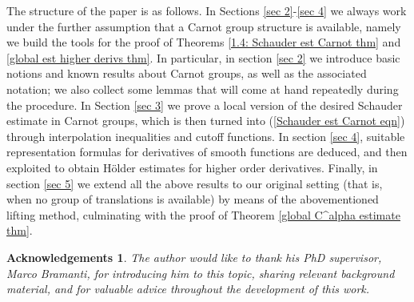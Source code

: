 \documentclass{article}
\newtheorem*{acknowledgement}{Acknowledgements}
\numberwithin{equation}{section}
\begin{document}
\vspace{2mm}

The structure of the paper is as follows. In Sections \ref{sec 2}-\ref{sec 4} we always work under the further assumption that a Carnot group structure is available, namely we build the tools for the proof of Theorems \ref{1.4: Schauder est Carnot thm} and \ref{global est higher derivs thm}. In particular, in section \ref{sec 2} we introduce basic notions and known results about Carnot groups, as well as the associated notation; we also collect some lemmas that will come at hand repeatedly during the procedure. In Section \ref{sec 3} we prove a local version of the desired Schauder estimate in Carnot groups, which is then turned into (\ref{Schauder est Carnot eqn}) through interpolation inequalities and cutoff functions. In section \ref{sec 4}, suitable representation formulas for derivatives of smooth functions are deduced, and then exploited to obtain Hölder estimates for higher order derivatives. Finally, in section \ref{sec 5} we extend all the above results to our original setting (that is, when no group of translations is available) by means of the abovementioned lifting method, culminating with the proof of Theorem \ref{global C^alpha estimate thm}.

\vspace{5mm}

\begin{acknowledgement}
    The author would like to thank his PhD supervisor, Marco Bramanti, for introducing him to this topic, sharing relevant background material, and for valuable advice throughout the development of this work.
\end{acknowledgement}

\vspace{5mm}
\end{document}

